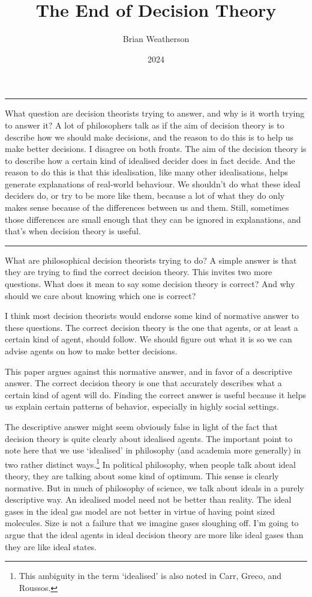 \documentclass[
  10pt,
  letterpaper,
  DIV=11,
  numbers=noendperiod,
  twoside]{scrartcl}
\title{The End of Decision Theory}
\author{Brian Weatherson}
\date{2024}
\renewenvironment{abstract}
 {\vspace{-1.25cm}
 \quotation\small\noindent\rule{\linewidth}{.5pt}\par\smallskip
 \noindent }
 {\par\noindent\rule{\linewidth}{.5pt}\endquotation}
\begin{document}
\maketitle
\begin{abstract}
What question are decision theorists trying to answer, and why is it
worth trying to answer it? A lot of philosophers talk as if the aim of
decision theory is to describe how we should make decisions, and the
reason to do this is to help us make better decisions. I disagree on
both fronts. The aim of the decision theory is to describe how a certain
kind of idealised decider does in fact decide. And the reason to do this
is that this idealisation, like many other idealisations, helps generate
explanations of real-world behaviour. We shouldn't do what these ideal
deciders do, or try to be more like them, because a lot of what they do
only makes sense because of the differences between us and them. Still,
sometimes those differences are small enough that they can be ignored in
explanations, and that's when decision theory is useful.
\end{abstract}


What are philosophical decision theorists trying to do? A simple answer
is that they are trying to find the correct decision theory. This
invites two more questions. What does it mean to say some decision
theory is correct? And why should we care about knowing which one is
correct?

I think most decision theorists would endorse some kind of normative
answer to these questions. The correct decision theory is the one that
agents, or at least a certain kind of agent, should follow. We should
figure out what it is so we can advise agents on how to make better
decisions.

This paper argues against this normative answer, and in favor of a
descriptive answer. The correct decision theory is one that accurately
describes what a certain kind of agent will do. Finding the correct
answer is useful because it helps us explain certain patterns of
behavior, especially in highly social settings.

The descriptive answer might seem obviously false in light of the fact
that decision theory is quite clearly about idealised agents. The
important point to note here that we use `idealised' in philosophy (and
academia more generally) in two rather distinct ways.\footnote{This
  ambiguity in the term `idealised' is also noted in Carr, Greco, and
  Roussos.} In political philosophy, when people talk about ideal
theory, they are talking about some kind of optimum. This sense is
clearly normative. But in much of philosophy of science, we talk about
ideals in a purely descriptive way. An idealised model need not be
better than reality. The ideal gases in the ideal gas model are not
better in virtue of having point sized molecules. Size is not a failure
that we imagine gases sloughing off. I'm going to argue that the ideal
agents in ideal decision theory are more like ideal gases than they are
like ideal states.
\end{document}
